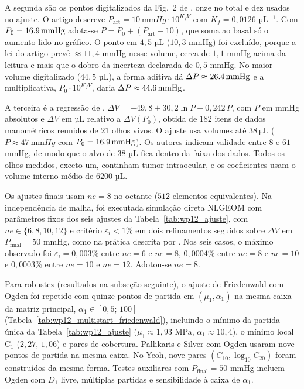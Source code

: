A segunda são os pontos digitalizados da Fig.~2 de \citet{pallikaris2005}, onze no total e dez usados no ajuste. O artigo descreve $P_{\mathrm{art}}=\SI{10}{\milli\meter Hg}\cdot10^{K_f V}$ com $K_f=0{,}0126$ µL$^{-1}$. Com $P_0=\SI{16{,}9}{\milli\meter Hg}$ adota-se $P=P_0+(P_{\mathrm{art}}-10)$, que soma ao basal só o aumento lido no gráfico. O ponto em $4{,}5$ µL ($10{,}3$ mmHg) foi excluído, porque a lei do artigo prevê $\approx11{,}4$ mmHg nesse volume, cerca de $1{,}1$ mmHg acima da leitura e mais que o dobro da incerteza declarada de $0{,}5$ mmHg. No maior volume digitalizado ($44{,}5$ µL), a forma aditiva dá $\Delta P\approx\SI{26{,}4}{\milli\meter Hg}$ e a multiplicativa, $P_0\cdot10^{K_f V}$, daria $\Delta P\approx\SI{44{,}6}{\milli\meter Hg}$.

A terceira é a regressão de \citet{silvergeyer2000}, $\Delta V=-49{,}8+30{,}2\ln P+0{,}242\,P$, com $P$ em mmHg absolutos e $\Delta V$ em µL relativo a $\Delta V(P_0)$, obtida de $182$ itens de dados manométricos reunidos de $21$ olhos vivos. O ajuste usa volumes até $\SI{38}{\micro\liter}$ ($P\approx\SI{47}{\milli\meter Hg}$ com $P_0=\SI{16{,}9}{\milli\meter Hg}$). Os autores indicam validade entre $8$ e $61$ mmHg, de modo que o alvo de $38$ µL fica dentro da faixa dos dados. Todos os olhos medidos, exceto um, continham tumor intraocular, e os coeficientes usam o volume interno médio de $6200$ µL.

Os ajustes finais usam $ne=8$ no octante ($512$ elementos equivalentes). Na independência de malha, foi executada simulação direta NLGEOM com parâmetros fixos dos seis ajustes da Tabela~\ref{tab:wp12_ajuste}, com $ne\in\{6,8,10,12\}$ e critério $\varepsilon_i<1\%$ em dois refinamentos seguidos sobre $\Delta V$ em $P_{\text{final}}=50$ mmHg, como na prática descrita por \citet{roache1997}. Nos seis casos, o máximo observado foi $\varepsilon_i=0{,}003\%$ entre $ne=6$ e $ne=8$, $0{,}0004\%$ entre $ne=8$ e $ne=10$ e $0{,}0003\%$ entre $ne=10$ e $ne=12$. Adotou-se $ne=8$.

Para robustez (resultados na subseção seguinte), o ajuste de Friedenwald com Ogden foi repetido com quinze pontos de partida em $(\mu_1,\alpha_1)$ na mesma caixa da matriz principal, $\alpha_1\in[0{,}5;\,100]$ (Tabela~\ref{tab:wp12_multistart_friedenwald}), incluindo o mínimo da partida única da Tabela~\ref{tab:wp12_ajuste} ($\mu_1\approx1{,}93$ MPa, $\alpha_1\approx10{,}4$), o mínimo local $\mathrm{C}_1$ ($2{,}27$, $1{,}06$) e pares de cobertura. Pallikaris e Silver com Ogden usaram nove pontos de partida na mesma caixa. No Yeoh, nove pares $(C_{10},\log_{10}C_{20})$ foram construídos da mesma forma. Testes auxiliares com $P_{\text{final}}=50$ mmHg incluem Ogden com $D_1$ livre, múltiplas partidas e sensibilidade à caixa de $\alpha_1$.

